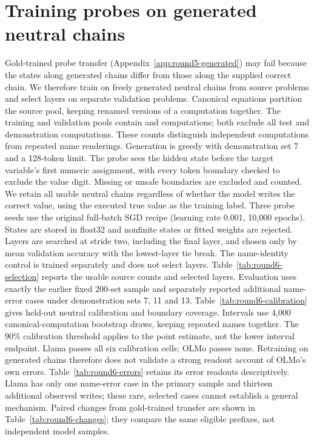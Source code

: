 \newsavebox{\roundsixbox}
\section{Training probes on generated neutral chains}
\label{app:round6-generated}
Gold-trained probe transfer (Appendix~\ref{app:round5-generated}) may fail because the states along generated chains differ from those along the supplied correct chain. We therefore train on freely generated neutral chains from  source problems and select layers on  separate validation problems. Canonical equations partition the source pool, keeping renamed versions of a computation together. The training and validation pools contain  and  computations; both exclude all test and demonstration computations. These counts distinguish independent computations from repeated name renderings.
Generation is greedy with demonstration set 7 and a 128-token limit. The probe sees the hidden state before the target variable's first numeric assignment, with every token boundary checked to exclude the value digit. Missing or unsafe boundaries are excluded and counted. We retain all usable neutral chains regardless of whether the model writes the correct value, using the executed true value as the training label. Three probe seeds use the original full-batch SGD recipe (learning rate 0.001, 10,000 epochs). States are stored in float32 and nonfinite states or fitted weights are rejected. Layers are searched at stride two, including the final layer, and chosen only by mean validation accuracy with the lowest-layer tie break. The name-identity control is trained separately and does not select layers.
Table~\ref{tab:round6-selection} reports the usable source counts and selected layers. Evaluation uses exactly the earlier fixed 200-set sample and separately reported additional name-error cases under demonstration sets 7, 11 and 13. Table~\ref{tab:round6-calibration} gives held-out neutral calibration and boundary coverage. Intervals use 4,000 canonical-computation bootstrap draws, keeping repeated names together. The 90\% calibration threshold applies to the point estimate, not the lower interval endpoint.
Llama passes all six calibration cells; OLMo passes none. Retraining on generated chains therefore does not validate a strong readout account of OLMo's own errors. Table~\ref{tab:round6-errors} retains its error readouts descriptively. Llama has only one name-error case in the primary sample and thirteen additional observed writes; these rare, selected cases cannot establish a general mechanism. Paired changes from gold-trained transfer are shown in Table~\ref{tab:round6-changes}; they compare the same eligible prefixes, not independent model samples.

